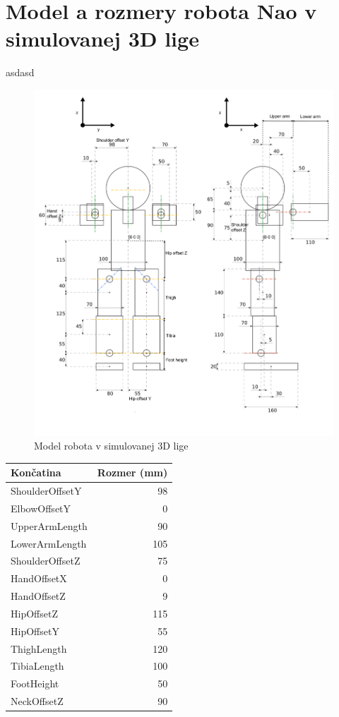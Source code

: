 \section{Model a rozmery robota Nao v simulovanej 3D lige}
	\label{appendix_nao_model}
asdasd
\begin{figure}[H]
  \center
  \includegraphics[scale=1.5]{./data/nao_model}
  \caption{Model robota v simulovanej 3D lige \cite{simspark}}
  \label{nao_model}
\end{figure}
\begin{center}
\begin{tabular}{|l|r|}
\hline
\textbf{Končatina} & \textbf{Rozmer (mm)} \\ 
\hline
ShoulderOffsetY	& 98 \\
\hline
ElbowOffsetY & 0 \\
\hline
UpperArmLength & 90 \\
\hline
LowerArmLength & 105 \\
\hline
ShoulderOffsetZ	& 75 \\
\hline
HandOffsetX	& 0 \\
\hline
HandOffsetZ & 9 \\
\hline
HipOffsetZ & 115 \\
\hline
HipOffsetY & 55 \\
\hline
ThighLength	& 120 \\
\hline
TibiaLength	& 100 \\
\hline
FootHeight & 50 \\
\hline
NeckOffsetZ & 90 \\
\hline
\end{tabular}
\end{center}